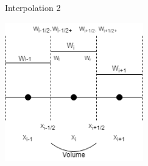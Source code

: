 \documentclass{beamer}
\begin{document}
            \begin{frame}{Interpolation 2}
                \begin{center}
                    \includegraphics[width=6cm]{2ndorder.png}
                \end{center}
            \end{frame}
        
            
            
    
\end{document}
